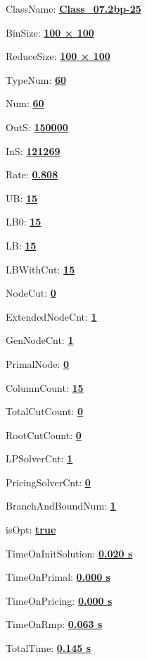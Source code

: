 \documentclass[11pt]{article}
\begin{document}
\pagestyle{empty}


ClassName: \underline{\textbf{Class_07.2bp-25}}
\par
BinSize: \underline{\textbf{100 × 100}}
\par
ReduceSize: \underline{\textbf{100 × 100}}
\par
TypeNum: \underline{\textbf{60}}
\par
Num: \underline{\textbf{60}}
\par
OutS: \underline{\textbf{150000}}
\par
InS: \underline{\textbf{121269}}
\par
Rate: \underline{\textbf{0.808}}
\par
UB: \underline{\textbf{15}}
\par
LB0: \underline{\textbf{15}}
\par
LB: \underline{\textbf{15}}
\par
LBWithCut: \underline{\textbf{15}}
\par
NodeCut: \underline{\textbf{0}}
\par
ExtendedNodeCnt: \underline{\textbf{1}}
\par
GenNodeCnt: \underline{\textbf{1}}
\par
PrimalNode: \underline{\textbf{0}}
\par
ColumnCount: \underline{\textbf{15}}
\par
TotalCutCount: \underline{\textbf{0}}
\par
RootCutCount: \underline{\textbf{0}}
\par
LPSolverCnt: \underline{\textbf{1}}
\par
PricingSolverCnt: \underline{\textbf{0}}
\par
BranchAndBoundNum: \underline{\textbf{1}}
\par
isOpt: \underline{\textbf{true}}
\par
TimeOnInitSolution: \underline{\textbf{0.020 s}}
\par
TimeOnPrimal: \underline{\textbf{0.000 s}}
\par
TimeOnPricing: \underline{\textbf{0.000 s}}
\par
TimeOnRmp: \underline{\textbf{0.063 s}}
\par
TotalTime: \underline{\textbf{0.145 s}}
\par
\newpage


\end{document}
